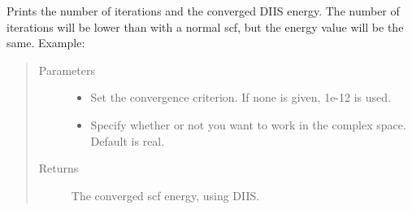 \documentclass[letterpaper,10pt,english]{sphinxmanual}
\begin{document}
\begin{fulllineitems}
\begin{fulllineitems}
\end{fulllineitems}


\begin{fulllineitems}
\label{\detokenize{RHF:hf.HartreeFock.RHF.MF.get_scf_solution_diis}}
Prints the number of iterations and the converged DIIS energy. The number of iterations will be lower than with
a normal scf, but the energy value will be the same. Example:

\begin{sphinxVerbatim}[commandchars=\\\{\}]
   
       
   
\end{sphinxVerbatim}
\begin{quote}\begin{description}
\item[{Parameters}] \leavevmode\begin{itemize}
\item {} 
 \textendash{} Set the convergence criterion. If none is given, 1e-12 is used.

\item {} 
 \textendash{} Specify whether or not you want to work in the complex space. Default is real.

\end{itemize}

\item[{Returns}] \leavevmode
The converged scf energy, using DIIS.


\end{description}
\end{quote}
\end{fulllineitems}
\end{fulllineitems}
\end{document}
